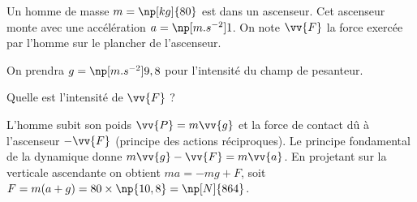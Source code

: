 
\finEntrainement







\hauteurLargeurCadreReponse		{6mm}{3cm}
\initialisationEntrainement

Un homme de masse $m=\np[kg]{80}$ est dans un ascenseur. Cet ascenseur monte avec une accélération $a = \np[m.s^{-2}]{1}$. On note $\vv{F}$ la force exercée par l'homme sur le plancher de l'ascenseur.

On prendra $g=\np[m.s^{-2}]{9,8}$ pour l'intensité du champ de pesanteur.

\debutEntrainement


\begin{enonce}
	 Quelle est l'intensité de $\vv{F}$ ?
\end{enonce}


\begin{corrige}
L'homme subit son poids $\vv{P}=m \vv{g}$ et la force de contact dû à l'ascenseur $-\vv{F}$ (principe des actions réciproques). Le principe fondamental de la dynamique donne $m\vv{g}-\vv{F}=m \vv{a}$. En projetant sur la verticale ascendante on obtient 
$ma=-mg+F$, soit $F=m(a+g)=80\times \np{10,8}=\np[N]{864}$.
\end{corrige}

